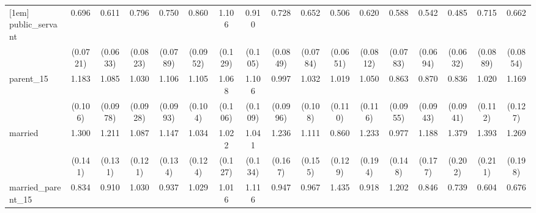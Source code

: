 {\begin{tabular}{l*{16}{c}}
[1em]
public\_servant      &       0.696\sym{***}&       0.611\sym{***}&       0.796\sym{*}  &       0.750\sym{**} &       0.860         &       1.106         &       0.910         &       0.728\sym{**} &       0.652\sym{***}&       0.506\sym{***}&       0.620\sym{***}&       0.588\sym{***}&       0.542\sym{***}&       0.485\sym{***}&       0.715\sym{**} &       0.662\sym{**} \\
                    &    (0.0721)         &    (0.0633)         &    (0.0823)         &    (0.0789)         &    (0.0952)         &     (0.129)         &     (0.105)         &    (0.0849)         &    (0.0784)         &    (0.0651)         &    (0.0812)         &    (0.0783)         &    (0.0694)         &    (0.0632)         &    (0.0889)         &    (0.0854)         \\
[1em]
parent\_15           &       1.183         &       1.085         &       1.030         &       1.106         &       1.105         &       1.068         &       1.106         &       0.997         &       1.032         &       1.019         &       1.050         &       0.863         &       0.870         &       0.836         &       1.020         &       1.169         \\
                    &     (0.106)         &    (0.0978)         &    (0.0928)         &    (0.0993)         &     (0.104)         &     (0.106)         &     (0.109)         &    (0.0996)         &     (0.108)         &     (0.110)         &     (0.116)         &    (0.0955)         &    (0.0943)         &    (0.0941)         &     (0.112)         &     (0.127)         \\
[1em]
married             &       1.300\sym{*}  &       1.211         &       1.087         &       1.147         &       1.034         &       1.022         &       1.041         &       1.236         &       1.111         &       0.860         &       1.233         &       0.977         &       1.188         &       1.379\sym{*}  &       1.393\sym{*}  &       1.269         \\
                    &     (0.141)         &     (0.131)         &     (0.121)         &     (0.134)         &     (0.124)         &     (0.127)         &     (0.134)         &     (0.167)         &     (0.155)         &     (0.129)         &     (0.194)         &     (0.148)         &     (0.177)         &     (0.202)         &     (0.211)         &     (0.198)         \\
[1em]
married\_parent\_15   &       0.834         &       0.910         &       1.030         &       0.937         &       1.029         &       1.016         &       1.116         &       0.947         &       0.967         &       1.435\sym{*}  &       0.918         &       1.202         &       0.846         &       0.739         &       0.604\sym{**} &       0.676\sym{*}  \\

\end{tabular}}
